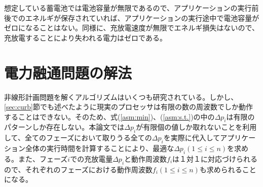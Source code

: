 想定している蓄電池では電池容量が無限であるので、アプリケーションの実行前後でのエネルギが保存されていれば、アプリケーションの実行途中で電池容量がゼロになることはない。同様に、充放電速度が無限でエネルギ損失はないので、充放電することにより失われる電力はゼロである。


\section{電力融通問題の解法}
\label{sec:algorithm}

非線形計画問題を解くアルゴリズムはいくつも研究されている。しかし、\ref{sec:curb}節でも述べたように現実のプロセッサは有限の数の周波数でしか動作することはできない。そのため、式(\ref{asm:min})、(\ref{asm:s.t.})の中の$\Delta p_i$は有限のパターンしか存在しない。本論文では$\Delta p_i$が有限個の値しか取れないことを利用して、全てのフェーズにおいて取りうる全ての$\Delta p_i$を実際に代入してアプリケーション全体の実行時間を計算することにより、最適な$\Delta p_i(1 \leq i \leq n)$を求める。また、フェーズ$i$での充放電量$\Delta p_i$と動作周波数$f_i$は１対１に対応づけられるので、それぞれのフェーズにおける動作周波数$f_i(1 \leq i \leq n)$も求められることになる。






